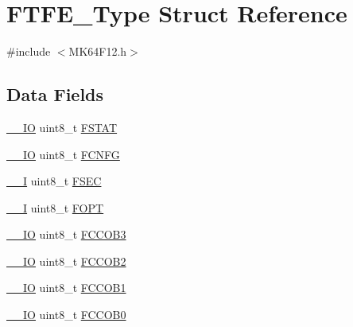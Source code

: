\hypertarget{struct_f_t_f_e___type}{}\section{F\+T\+F\+E\+\_\+\+Type Struct Reference}
\label{struct_f_t_f_e___type}


{\ttfamily \#include $<$M\+K64\+F12.\+h$>$}

\subsection*{Data Fields}
\begin{DoxyCompactItemize}
\item 
\mbox{\hyperlink{core__cm4_8h_aec43007d9998a0a0e01faede4133d6be}{\+\_\+\+\_\+\+IO}} uint8\+\_\+t \mbox{\hyperlink{group___v_r_e_f___peripheral___access___layer_gaef000e29f3b219eb64c053000c22fe97}{F\+S\+T\+AT}}
\item 
\mbox{\hyperlink{core__cm4_8h_aec43007d9998a0a0e01faede4133d6be}{\+\_\+\+\_\+\+IO}} uint8\+\_\+t \mbox{\hyperlink{group___v_r_e_f___peripheral___access___layer_ga06f204f3d6e31fa8b5c3af07bc098278}{F\+C\+N\+FG}}
\item 
\mbox{\hyperlink{core__cm4_8h_af63697ed9952cc71e1225efe205f6cd3}{\+\_\+\+\_\+I}} uint8\+\_\+t \mbox{\hyperlink{group___v_r_e_f___peripheral___access___layer_ga9c289cf99054de8442c0847062613f18}{F\+S\+EC}}
\item 
\mbox{\hyperlink{core__cm4_8h_af63697ed9952cc71e1225efe205f6cd3}{\+\_\+\+\_\+I}} uint8\+\_\+t \mbox{\hyperlink{group___v_r_e_f___peripheral___access___layer_ga4a588e9f6d971bfa0ec727d08935c72e}{F\+O\+PT}}
\item 
\mbox{\hyperlink{core__cm4_8h_aec43007d9998a0a0e01faede4133d6be}{\+\_\+\+\_\+\+IO}} uint8\+\_\+t \mbox{\hyperlink{group___v_r_e_f___peripheral___access___layer_ga9a966008c6b3e9777985b820a50c7634}{F\+C\+C\+O\+B3}}
\item 
\mbox{\hyperlink{core__cm4_8h_aec43007d9998a0a0e01faede4133d6be}{\+\_\+\+\_\+\+IO}} uint8\+\_\+t \mbox{\hyperlink{group___v_r_e_f___peripheral___access___layer_ga70dba78a9955734512a852eeea205781}{F\+C\+C\+O\+B2}}
\item 
\mbox{\hyperlink{core__cm4_8h_aec43007d9998a0a0e01faede4133d6be}{\+\_\+\+\_\+\+IO}} uint8\+\_\+t \mbox{\hyperlink{group___v_r_e_f___peripheral___access___layer_ga3b45993d28df53171645290c45bdb55c}{F\+C\+C\+O\+B1}}
\item 
\mbox{\hyperlink{core__cm4_8h_aec43007d9998a0a0e01faede4133d6be}{\+\_\+\+\_\+\+IO}} uint8\+\_\+t \mbox{\hyperlink{group___v_r_e_f___peripheral___access___layer_ga339e554f6ce0e1633a1e07f5ee9fd2ca}{F\+C\+C\+O\+B0}}

\end{DoxyCompactItemize}
